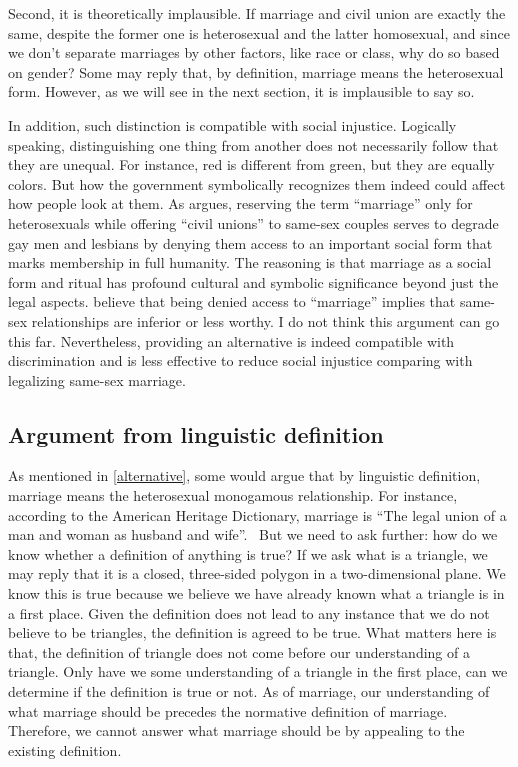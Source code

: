 \documentclass{article}
\begin{document}
Second, it is theoretically implausible. If marriage and civil union are exactly the same, despite the former one is heterosexual and the latter homosexual, and since we don't separate marriages by other factors, like race or class, why do so based on gender? Some may reply that, by definition, marriage means the heterosexual form. However, as we will see in the next section, it is implausible to say so. 

In addition, such distinction is compatible with social injustice. Logically speaking, distinguishing one thing from another does not necessarily follow that they are unequal. For instance, red is different from green, but they are equally colors. But how the government symbolically recognizes them indeed could affect how people look at them. As \textcite{mohrLongArcJustice2007} argues, reserving the term ``marriage'' only for heterosexuals while offering ``civil unions'' to same-sex couples serves to degrade gay men and lesbians by denying them access to an important social form that marks membership in full humanity. The reasoning is that marriage as a social form and ritual has profound cultural and symbolic significance beyond just the legal aspects.  believe that being denied access to ``marriage'' implies that same-sex relationships are inferior or less worthy. I do not think this argument can go this far. Nevertheless, providing an alternative is indeed compatible with discrimination and is less effective to reduce social injustice comparing with legalizing same-sex marriage.


\subsection{Argument from linguistic definition}

As mentioned in \ref{alternative}, some would argue that by linguistic definition, marriage means the heterosexual monogamous relationship. For instance, according to the American Heritage Dictionary, marriage is ``The legal union of a man and woman as husband and wife''.~\autocite{pickertAmericanHeritageDictionary2000} But we need to ask further: how do we know whether a definition of anything is true? If we ask what is a triangle, we may reply that it is a closed, three-sided polygon in a two-dimensional plane. We know this is true because we believe we have already known what a triangle is in a first place. Given the definition does not lead to any instance that we do not believe to be triangles, the definition is agreed to be true. What matters here is that, the definition of triangle does not come before our understanding of a triangle. Only have we some understanding of a triangle in the first place, can we determine if the definition is true or not. As of marriage, our understanding of what marriage should be precedes the normative definition of marriage. Therefore, we cannot answer what marriage should be by appealing to the existing definition.
\end{document}
